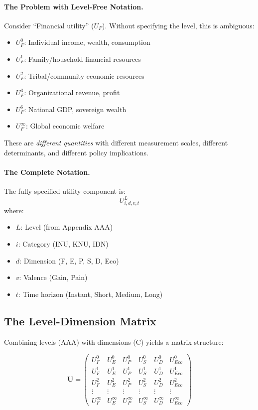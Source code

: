 \paragraph{The Problem with Level-Free Notation.}

Consider ``Financial utility'' ($U_F$). Without specifying the level, this is ambiguous:

\begin{itemize}[nosep]
\item $U^0_F$: Individual income, wealth, consumption
\item $U^1_F$: Family/household financial resources
\item $U^2_F$: Tribal/community economic resources
\item $U^3_F$: Organizational revenue, profit
\item $U^6_F$: National GDP, sovereign wealth
\item $U^{\infty}_F$: Global economic welfare
\end{itemize}

These are \textit{different quantities} with different measurement scales, different 
determinants, and different policy implications.

\paragraph{The Complete Notation.}

The fully specified utility component is:
\begin{equation}
U^L_{i,d,v,t}
\end{equation}
where:
\begin{itemize}[nosep]
\item $L$: Level (from Appendix AAA)
\item $i$: Category (INU, KNU, IDN)
\item $d$: Dimension (F, E, P, S, D, Eco)
\item $v$: Valence (Gain, Pain)
\item $t$: Time horizon (Instant, Short, Medium, Long)
\end{itemize}

\subsection{The Level-Dimension Matrix}

Combining levels (AAA) with dimensions (C) yields a matrix structure:

\begin{equation}
\mathbf{U} = \begin{pmatrix}
U^0_F & U^0_E & U^0_P & U^0_S & U^0_D & U^0_{Eco} \\
U^1_F & U^1_E & U^1_P & U^1_S & U^1_D & U^1_{Eco} \\
U^2_F & U^2_E & U^2_P & U^2_S & U^2_D & U^2_{Eco} \\
\vdots & \vdots & \vdots & \vdots & \vdots & \vdots \\
U^{\infty}_F & U^{\infty}_E & U^{\infty}_P & U^{\infty}_S & U^{\infty}_D & U^{\infty}_{Eco}
\end{pmatrix}
\end{equation}

